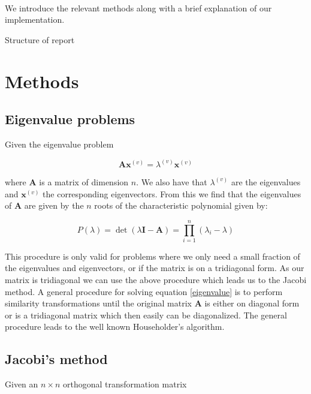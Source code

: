\documentclass[a4paper, fontsize=11pt]{article}
\begin{document}
\paragraph{}
We introduce the relevant methods along with a brief explanation of our implementation.


Structure of report


\section{Methods}


\subsection{Eigenvalue problems}
Given the eigenvalue problem 

\begin{equation} \label{eigenvalue}
\textbf{A}\textbf{x}^{(v)}=\lambda^{(v)}\textbf{x}^{(v)}
\end{equation}

where \textbf{A} is a matrix of dimension $n$. We also have that $\lambda^{(v)}$ are the eigenvalues and $\textbf{x}^{(v)}$ the corresponding eigenvectors. From this we find that the eigenvalues of \textbf{A} are given by the $n$ roots of the characteristic polynomial given by:

\begin{equation}
P(\lambda)=\det(\lambda \textbf{I} - \textbf{A}) = \prod^{n}_{i=1}(\lambda_{i} - \lambda)
\end{equation}

This procedure is only valid for problems where we only need a small fraction of the eigenvalues and eigenvectors, or if the matrix is on a tridiagonal form. As our matrix is tridiagonal we can use the above procedure which leads us to the Jacobi method. A general procedure for solving equation \eqref{eigenvalue} is to perform similarity transformations until the original matrix \textbf{A} is either on diagonal form or is a tridiagonal matrix which then easily can be diagonalized. The general procedure leads to the well known Householder's algorithm.\cite{Jensen}


\subsection{Jacobi's method}
Given an $n \times n$ orthogonal transformation matrix
\end{document}
